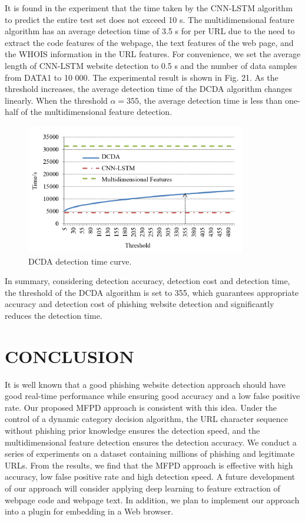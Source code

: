 \documentclass{ieeeaccess}
\begin{document}
\par It is found in the experiment that the time taken by the CNN-LSTM algorithm to predict the entire test set does not exceed 10 s. The multidimensional feature algorithm has an average detection time of 3.5 s for per URL due to the need to extract the code features of the webpage, the text features of the web page, and the WHOIS information in the URL features. For convenience, we set the average length of CNN-LSTM website detection to 0.5 s and the number of data samples from DATA1 to 10 000. The experimental result is shown in Fig. 21. As the threshold increases, the average detection time of the DCDA algorithm changes linearly.
When the threshold $\alpha = 355$, the average detection time is less than one-half of the multidimensional feature detection.
\begin{figure}
    \centering
    \includegraphics[width=\linewidth]{figure21.png}
    \caption{DCDA detection time curve.}
    \label{fig:21}
\end{figure}
\par In summary, considering detection accuracy, detection cost
and detection time, the threshold of the DCDA algorithm
is set to 355, which guarantees appropriate accuracy and
detection cost of phishing website detection and significantly
reduces the detection time.

\section{CONCLUSION}
It is well known that a good phishing website detection
approach should have good real-time performance while
ensuring good accuracy and a low false positive rate. Our proposed
MFPD approach is consistent with this idea. Under the
control of a dynamic category decision algorithm, the URL
character sequence without phishing prior knowledge ensures
the detection speed, and the multidimensional feature detection
ensures the detection accuracy. We conduct a series of
experiments on a dataset containing millions of phishing and
legitimate URLs. From the results, we find that the MFPD
approach is effective with high accuracy, low false positive
rate and high detection speed. A future development of our
approach will consider applying deep learning to feature
extraction of webpage code and webpage text. In addition, we
plan to implement our approach into a plugin for embedding
in a Web browser.
\end{document}
